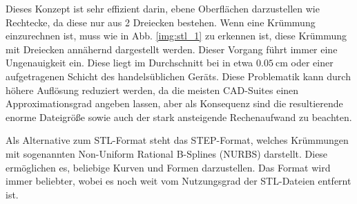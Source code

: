 \documentclass[main.tex]{subfiles}
\begin{document}
Dieses Konzept ist sehr effizient darin, ebene Oberflächen darzustellen wie Rechtecke, da diese nur aus 2 Dreiecken bestehen. Wenn eine Krümmung einzurechnen ist, muss wie in Abb. \ref{img:stl_1} zu erkennen ist, diese Krümmung mit Dreiecken annähernd dargestellt werden. Dieser Vorgang führt immer eine Ungenauigkeit ein. Diese liegt im Durchschnitt bei in etwa $\qty{0.05}{\centi\metre}$ oder einer aufgetragenen Schicht des handelsüblichen Geräts. Diese Problematik kann durch höhere Auflösung reduziert werden, da die meisten CAD-Suites einen Approximationsgrad angeben lassen, aber als Konsequenz sind die resultierende enorme Dateigröße sowie auch der stark ansteigende Rechenaufwand zu beachten. \parencite{ADOBLESTL} 

Als Alternative zum STL-Format steht das STEP-Format, welches Krümmungen mit sogenannten Non-Uniform Rational B-Splines (NURBS) darstellt.
Diese ermöglichen es, beliebige Kurven und Formen darzustellen. Das Format wird immer beliebter, wobei es noch weit  vom Nutzungsgrad der STL-Dateien entfernt ist. \parencite{ADOBESTEP}
\end{document}
